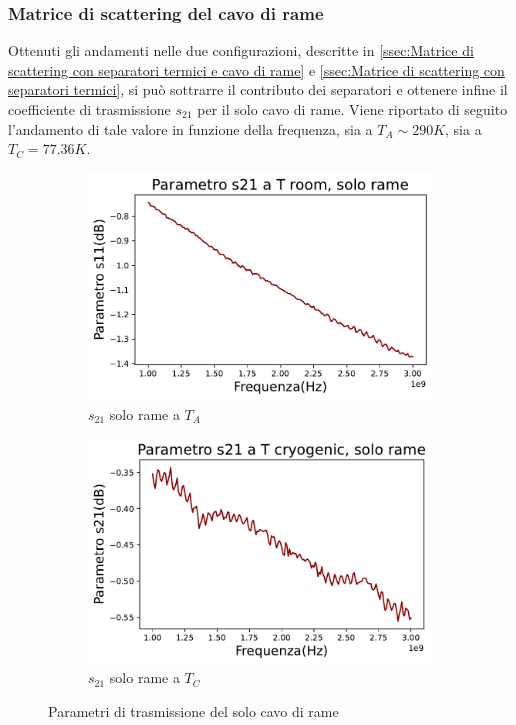\subsubsection{Matrice di scattering del cavo di rame}
\label{ssec:Matrice di scattering del cavo di rame}

Ottenuti gli andamenti nelle due configurazioni, descritte in \ref{ssec:Matrice di scattering con separatori termici e cavo di rame} e \ref{ssec:Matrice di scattering con separatori termici}, si può sottrarre il contributo dei separatori e ottenere infine il coefficiente di trasmissione $s_{21}$ per il solo cavo di rame. Viene riportato di seguito l'andamento di tale valore in funzione della frequenza, sia a $ T_{A}\sim290K $, sia a $ T_{C} = 77.36K $.

\begin{figure}[H]
\centering

\begin{subfigure}{0.49\textwidth}
	\includegraphics[width=\textwidth]{S21_TA_solo_rame.pdf}
    \caption{$s_{21}$ solo rame a $T_{A}$}
    \label{fig:sub1}
\end{subfigure}
\hfill
\begin{subfigure}{0.49\textwidth}
    \includegraphics[width=\textwidth]{S21_TC_solo_rame.pdf}
    \caption{$s_{21}$ solo rame a $T_{C}$}
    \label{fig:sub2}
\end{subfigure}
\caption{Parametri di trasmissione del solo cavo di rame}
\label{fig:Solo_rame}
\end{figure}



